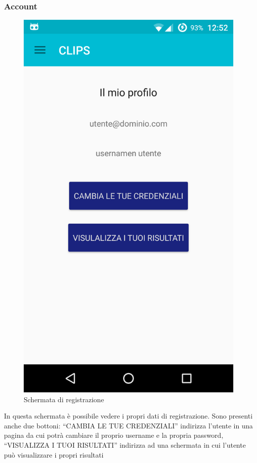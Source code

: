 \subsubsection{Account}
\begin{figure}[!h]
	\centering
	\includegraphics[scale=0.15]{screenshot/account}
	\caption{Schermata di registrazione}
\end{figure}
In questa schermata è possibile vedere i propri dati di registrazione. Sono presenti anche due bottoni: ``CAMBIA LE TUE CREDENZIALI'' indirizza l'utente in una pagina da cui potrà cambiare il proprio username e la propria password, ``VISUALIZZA I TUOI RISULTATI'' indirizza ad una schermata in cui l'utente può visualizzare i propri risultati